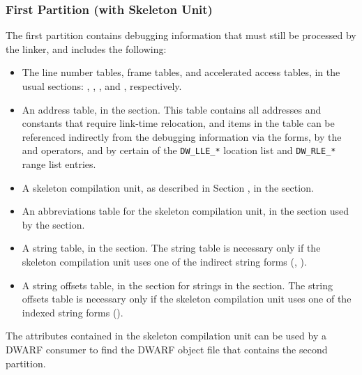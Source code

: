 \subsubsection{First Partition (with Skeleton Unit)}
The first partition contains
debugging information that must still be processed by the linker,
and includes the following:
\begin{itemize}
\item
The line number tables, frame tables, and
accelerated access tables, in the usual sections:
\dotdebugline, \dotdebuglinestr, 
\dotdebugframe, \dotdebugnames{} and \dotdebugaranges,
respectively.
\item
An address table, in the \dotdebugaddr{} section. This table
contains all addresses and constants that require
link-time relocation, and items in the table can be
referenced indirectly from the debugging information via
the \DWFORMaddrxXNand{} forms, 
by the \DWOPaddrx{} and \DWOPconstx{} operators, and
by certain of the \texttt{DW\_LLE\_*} location list
and \texttt{DW\_RLE\_*} range list entries.
\item
A skeleton compilation unit, as described in Section
, 
in the \dotdebuginfo{} section.
\item
An abbreviations table for the skeleton compilation unit,
in the \dotdebugabbrev{} section
used by the \dotdebuginfo{} section.

\item
A string table, in the \dotdebugstr{} section. The string
table is necessary only if the skeleton compilation unit
\bb
uses one of the indirect string forms (\DWFORMstrp{}, 
\DWFORMstrxXNor).
\eb
{}
\item
A string offsets table, in the \dotdebugstroffsets{}
section for strings in the \dotdebugstr{} section. 
The string offsets table is necessary only if
the skeleton compilation unit uses 
\bb
one of the indexed string forms 
\eb
(\DWFORMstrxXN).
\end{itemize}
The attributes contained in the skeleton compilation
unit can be used by a DWARF consumer to find the 
DWARF object file that contains the second partition.

